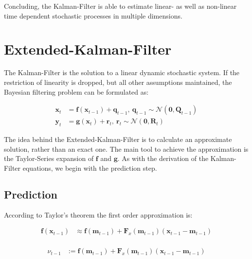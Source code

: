 \documentclass[
]{article}
\begin{document}
Concluding, the Kalman-Filter is able to estimate linear- as well as
non-linear time dependent stochastic processes in multiple dimensions.

\hypertarget{extended-kalman-filter}{%
\section{Extended-Kalman-Filter}\label{extended-kalman-filter}}

The Kalman-Filter is the solution to a linear dynamic stochastic system.
If the restriction of linearity is dropped, but all other assumptions
maintained, the Bayesian filtering problem can be formulated as:

\[
\begin{equation*} 
    \begin{aligned}
        \textbf{x}_t &= \textbf{f}(\textbf{x}_{t-1}) + \textbf{q}_{t-1},\ \textbf{q}_{t-1} \sim \mathcal{N}(\textbf{0},\textbf{Q}_{t-1}) \\
        \textbf{y}_t &= \textbf{g}(\textbf{x}_t) + \textbf{r}_t, \ \textbf{r}_t \sim \mathcal{N}(\textbf{0},\textbf{R}_{t})          
    \end{aligned}
\end{equation*}
\]

The idea behind the Extended-Kalman-Filter is to calculate an
approximate solution, rather than an exact one. The main tool to achieve
the approximation is the Taylor-Series expansion of \(\textbf{f}\) and
\(\textbf{g}\). As with the derivation of the Kalman-Filter equations,
we begin with the prediction step.

\hypertarget{prediction}{%
\subsection{Prediction}\label{prediction}}

According to Taylor's theorem the first order approximation is:

\[
\begin{equation*}
    \begin{aligned}
        \textbf{f}(\textbf{x}_{t-1}) &\approx \textbf{f}(\textbf{m}_{t-1}) + \textbf{F}_x(\textbf{m}_{t-1})(\textbf{x}_{t-1} - \textbf{m}_{t-1})  \\
    \end{aligned}
\end{equation*}
\]

\[
\begin{equation*} 
    \begin{aligned}
        \nu_{t-1} &:= \textbf{f}(\textbf{m}_{t-1}) + \textbf{F}_x(\textbf{m}_{t-1})(\textbf{x}_{t-1} - \textbf{m}_{t-1})\\
    \end{aligned}
\end{equation*}    
\]
\end{document}
